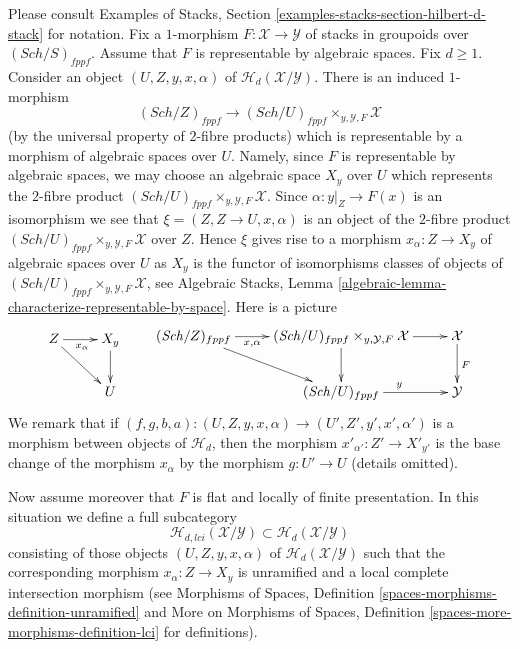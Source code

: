 \documentclass{stacks-project}
\theoremstyle{plain}
\theoremstyle{definition}
\theoremstyle{remark}
\numberwithin{equation}{subsection}
\def\Sch{\mathit{Sch}}
\begin{document}
\noindent
Please consult
Examples of Stacks, Section \ref{examples-stacks-section-hilbert-d-stack}
for notation. Fix a $1$-morphism $F : \mathcal{X} \longrightarrow \mathcal{Y}$
of stacks in groupoids over $(\Sch/S)_{fppf}$. Assume that
$F$ is representable by algebraic spaces. Fix $d \geq 1$. Consider an
object $(U, Z, y, x, \alpha)$ of $\mathcal{H}_d(\mathcal{X}/\mathcal{Y})$.
There is an induced $1$-morphism
$$
(\Sch/Z)_{fppf}
\longrightarrow
(\Sch/U)_{fppf} \times_{y, \mathcal{Y}, F} \mathcal{X}
$$
(by the universal property of $2$-fibre products) which is representable by
a morphism of algebraic spaces over $U$.
Namely, since $F$ is representable by algebraic spaces, we may choose
an algebraic space $X_y$ over $U$ which represents the $2$-fibre product
$(\Sch/U)_{fppf} \times_{y, \mathcal{Y}, F} \mathcal{X}$.
Since $\alpha : y|_Z \to F(x)$ is an isomorphism we see that
$\xi = (Z, Z \to U, x, \alpha)$ is an object of the $2$-fibre product
$(\Sch/U)_{fppf} \times_{y, \mathcal{Y}, F} \mathcal{X}$ over $Z$.
Hence $\xi$ gives rise to a morphism $x_\alpha : Z \to X_y$ of algebraic spaces
over $U$ as $X_y$ is the functor of isomorphisms classes of objects of
$(\Sch/U)_{fppf} \times_{y, \mathcal{Y}, F} \mathcal{X}$, see
Algebraic Stacks,
Lemma \ref{algebraic-lemma-characterize-representable-by-space}.
Here is a picture
\begin{equation}
\label{equation-relative-map}
\vcenter{
\xymatrix{
Z \ar[r]_{x_\alpha} \ar[rd] & X_y \ar[d] \\
& U
}
}
\quad\quad
\vcenter{
\xymatrix{
(\Sch/Z)_{fppf} \ar[rd] \ar[r]_-{x, \alpha} &
(\Sch/U)_{fppf} \times_{y, \mathcal{Y}, F} \mathcal{X} \ar[r] \ar[d] &
\mathcal{X} \ar[d]^F \\
& (\Sch/U)_{fppf} \ar[r]^y & \mathcal{Y}
}
}
\end{equation}
We remark that if
$(f, g, b, a) : (U, Z, y, x, \alpha) \to (U', Z', y', x', \alpha')$
is a morphism between objects of $\mathcal{H}_d$, then the morphism
$x'_{\alpha'} : Z' \to X'_{y'}$ is the base change of the morphism
$x_\alpha$ by the morphism $g : U' \to U$ (details omitted).

\medskip\noindent
Now assume moreover that $F$ is flat and locally of finite presentation.
In this situation we define a full subcategory
$$
\mathcal{H}_{d, lci}(\mathcal{X}/\mathcal{Y}) \subset
\mathcal{H}_d(\mathcal{X}/\mathcal{Y})
$$
consisting of those objects $(U, Z, y, x, \alpha)$ of
$\mathcal{H}_d(\mathcal{X}/\mathcal{Y})$ such
that the corresponding morphism $x_\alpha : Z \to X_y$ is unramified
and a local complete intersection morphism (see
Morphisms of Spaces, Definition \ref{spaces-morphisms-definition-unramified}
and
More on Morphisms of Spaces,
Definition \ref{spaces-more-morphisms-definition-lci}
for definitions).
\end{document}
